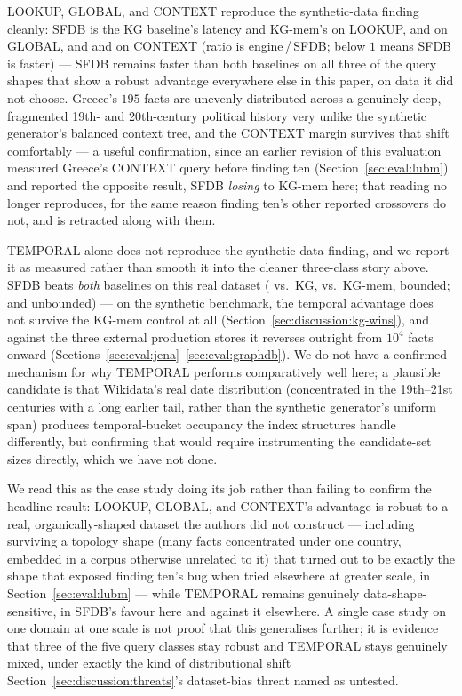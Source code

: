 LOOKUP, GLOBAL, and CONTEXT reproduce the synthetic-data finding cleanly: SFDB is
\wikidatalookupkg{} the KG baseline's latency and \wikidatalookupkgmem{}
KG-mem's on LOOKUP, \wikidataglobalkg{} and \wikidataglobalkgmem{}
on GLOBAL, and \wikidatacontextkg{} and \wikidatacontextkgmem{} on
CONTEXT (ratio is engine\,/\,SFDB; below $1$ means SFDB
is faster) --- SFDB remains faster than both baselines on all three of
the query shapes that show a robust advantage everywhere else in this
paper, on data it did not choose. Greece's $195$ facts are unevenly
distributed across a genuinely deep, fragmented 19th- and 20th-century
political history very unlike the synthetic generator's balanced context
tree, and the CONTEXT margin survives that shift comfortably --- a
useful confirmation, since an earlier revision of this evaluation
measured Greece's CONTEXT query before finding ten
(Section~\ref{sec:eval:lubm}) and reported the opposite result, SFDB
\emph{losing} to KG-mem here; that reading no longer reproduces, for the
same reason finding ten's other reported crossovers do not, and is
retracted along with them.

TEMPORAL alone does not reproduce the synthetic-data finding, and we
report it as measured rather than smooth it into the cleaner three-class
story above. SFDB beats \emph{both} baselines on this real dataset
(\wikidatatemporalkg{} vs.\ KG, \wikidatatemporalkgmem{} vs.\ KG-mem,
bounded; \wikidatatemporalunbkg{} and \wikidatatemporalunbkgmem{}
unbounded) --- on the synthetic benchmark, the temporal advantage does
not survive the KG-mem control at all
(Section~\ref{sec:discussion:kg-wins}), and against the three external
production stores it reverses outright from $10^4$ facts onward
(Sections~\ref{sec:eval:jena}--\ref{sec:eval:graphdb}). We do not have a
confirmed mechanism for why TEMPORAL performs comparatively well here;
a plausible candidate is that Wikidata's
real date distribution (concentrated in the 19th--21st centuries with a
long earlier tail, rather than the synthetic generator's uniform span)
produces temporal-bucket occupancy the index structures handle
differently, but confirming that would require instrumenting the
candidate-set sizes directly, which we have not done.

We read this as the case study doing its job rather than failing to
confirm the headline result: LOOKUP, GLOBAL, and CONTEXT's advantage is robust to
a real, organically-shaped dataset the authors did not construct ---
including surviving a topology shape (many facts concentrated under one
country, embedded in a corpus otherwise unrelated to it) that turned out
to be exactly the shape that exposed finding ten's bug when tried
elsewhere at greater scale, in Section~\ref{sec:eval:lubm} --- while
TEMPORAL remains genuinely data-shape-sensitive, in SFDB's favour here
and against it elsewhere. A single case study on one domain at one scale
is not proof that this generalises further; it is evidence that three
of the five query classes stay robust and TEMPORAL stays genuinely
mixed, under exactly the kind of distributional shift
Section~\ref{sec:discussion:threats}'s dataset-bias threat named as
untested.

